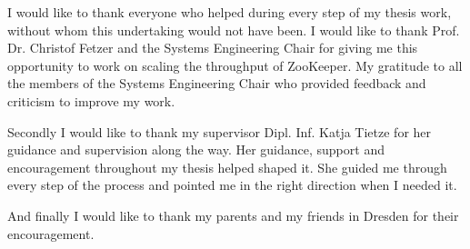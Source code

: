 I would like to thank everyone who helped during every step of my thesis work, without whom this undertaking would not have been. I would like to thank Prof. Dr. Christof Fetzer and the Systems Engineering Chair for giving me this opportunity to work on scaling the throughput of ZooKeeper. My gratitude to all the members of the Systems Engineering Chair who provided feedback and criticism to improve my work.

Secondly I would like to thank my supervisor Dipl. Inf. Katja Tietze for her guidance and supervision along the way. Her guidance, support and encouragement throughout my thesis helped shaped it. She guided me through every step of the process and pointed me in the right direction when I needed it.

And finally I would like to thank my parents and my friends in Dresden for their encouragement.
